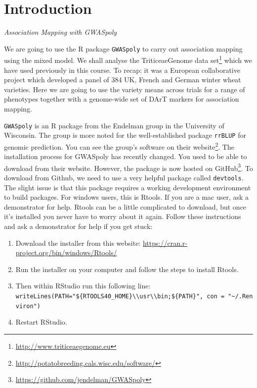 \documentclass[
]{book}
\renewcommand{\href}[2]{#2\footnote{\url{#1}}}
\begin{document}
\hypertarget{introduction-1}{%
\section{Introduction}\label{introduction-1}}

\emph{Association Mapping with GWASpoly}

We are going to use the R package \texttt{GWASpoly} to carry out association mapping using the mixed model. We shall analyse the \href{http://www.triticeaegenome.eu}{TriticeaeGenome data set} which we have used previously in this course. To recap: it was a European collaborative project which developed a panel of 384 UK, French and German winter wheat varieties. Here we are going to use the variety means across trials for a range of phenotypes together with a genome-wide set of DArT markers for association mapping.

\texttt{GWASpoly} is an R package from the Endelman group in the University of Wisconsin. The group is more noted for the well-established package \texttt{rrBLUP} for genomic prediction. You can see the group's software on their \href{http://potatobreeding.cals.wisc.edu/software/}{website}. The installation process for GWASpoly has recently changed. You used to be able to download from their website. However, the package is now hosted on \href{https://github.com/jendelman/GWASpoly}{GitHub}. To download from Github, we need to use a very helpful package called \texttt{devtools}. The slight issue is that this package requires a working development environment to build packages. For windows users, this is Rtools. If you are a mac user, ask a demonstrator for help. Rtools can be a little complicated to download, but once it's installed you never have to worry about it again. Follow these instructions and ask a demonstrator for help if you get stuck:

\begin{enumerate}
\def\labelenumi{\arabic{enumi}.}
\item
  Download the installer from this website: \url{https://cran.r-project.org/bin/windows/Rtools/}
\item
  Run the installer on your computer and follow the steps to install Rtools.
\item
  Then within RStudio run this following line: \texttt{writeLines(\textquotesingle{}PATH="\$\{RTOOLS40\_HOME\}\textbackslash{}\textbackslash{}usr\textbackslash{}\textbackslash{}bin;\$\{PATH\}"\textquotesingle{},\ con\ =\ "\textasciitilde{}/.Renviron")}
\item
  Restart RStudio.
\end{enumerate}
\end{document}
